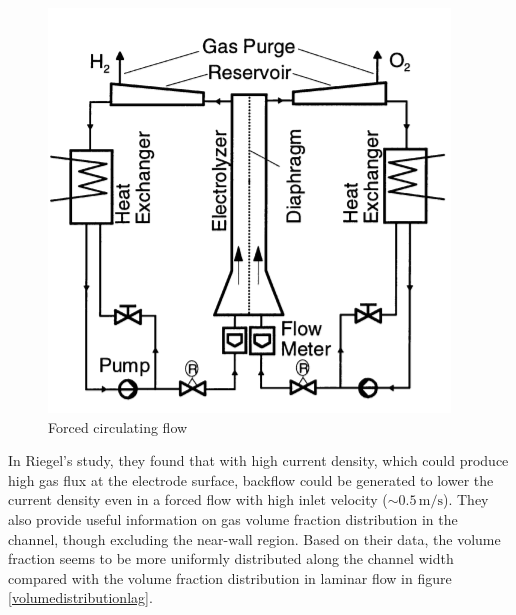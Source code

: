 \begin{figure}[H]
    \centering
    \includegraphics[scale=0.7]{pump.png}
    \caption{Forced circulating flow \cite{riegel1998role}}
    \label{pump}
\end{figure}

In Riegel's study, they found that with high current density, which could produce high gas flux at the electrode surface, backflow could be generated to lower the current density even in a forced flow with high inlet velocity ($\sim 0.5 \, \mathrm{m/s}$). They also provide useful information on gas volume fraction distribution in the channel, though excluding the near-wall region. Based on their data, the volume fraction seems to be more uniformly distributed along the channel width compared with the volume fraction distribution in laminar flow in figure \ref{volumedistributionlag}.

